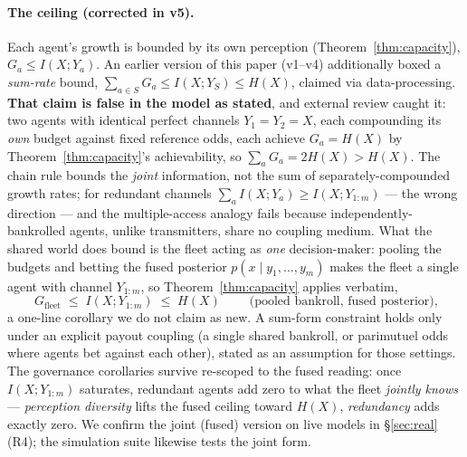 \documentclass[11pt]{article}
\theoremstyle{plain}
\theoremstyle{definition}
\theoremstyle{remark}
\newcommand{\I}{I}
\begin{document}
\paragraph{The ceiling (corrected in v5).} Each agent's growth is bounded by its own perception
(Theorem~\ref{thm:capacity}), $G_a\le \I(X;Y_a)$. An earlier version of this paper (v1--v4) additionally boxed
a \emph{sum-rate} bound, $\sum_{a\in S} G_a \le \I(X;Y_S) \le H(X)$, claimed via data-processing. \textbf{That
claim is false in the model as stated}, and external review caught it: two agents with identical perfect
channels $Y_1=Y_2=X$, each compounding its \emph{own} budget against fixed reference odds, each achieve
$G_a=H(X)$ by Theorem~\ref{thm:capacity}'s achievability, so $\sum_a G_a = 2H(X) > H(X)$. The chain rule bounds
the \emph{joint} information, not the sum of separately-compounded growth rates; for redundant channels
$\sum_a \I(X;Y_a) \ge \I(X;Y_{1:m})$ --- the wrong direction --- and the multiple-access analogy fails because
independently-bankrolled agents, unlike transmitters, share no coupling medium. What the shared world does
bound is the fleet acting as \emph{one} decision-maker: pooling the budgets and betting the fused posterior
$p(x\mid y_1,\dots,y_m)$ makes the fleet a single agent with channel $Y_{1:m}$, so Theorem~\ref{thm:capacity}
applies verbatim,
\begin{equation}\label{eq:ceiling}
\boxed{\;G_{\mathrm{fleet}} \;\le\; \I(X;Y_{1:m})\;\le\; H(X)\;}\qquad\text{(pooled bankroll, fused posterior)},
\end{equation}
a one-line corollary we do not claim as new. A sum-form constraint holds only under an explicit payout
coupling (a single shared bankroll, or parimutuel odds where agents bet against each other), stated as an
assumption for those settings. The governance corollaries survive re-scoped to the fused reading: once
$\I(X;Y_{1:m})$ saturates, redundant agents add zero to what the fleet \emph{jointly knows} — \emph{perception
diversity} lifts the fused ceiling toward $H(X)$, \emph{redundancy} adds exactly zero. We confirm the joint
(fused) version on live models in \S\ref{sec:real} (R4); the simulation suite likewise tests the joint form.
\end{document}
